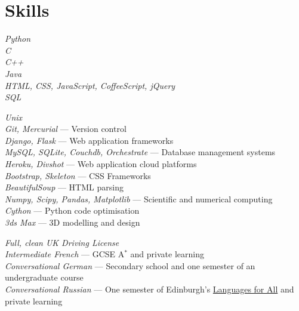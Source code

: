 \documentclass[10pt]{article}
\begin{document}


    \newpage

    \section{Skills}

        {
            \textit{Python}\\
            \textit{C}\\
            \textit{C++}\\
            \textit{Java}\\
            \textit{HTML, CSS, JavaScript, CoffeeScript, jQuery}\\
            \textit{SQL}\\
        }

        {
            \textit{Unix}\\
            \textit{Git, Mercurial} --- Version control\\
            \textit{Django, Flask} --- Web application frameworks\\
            \textit{MySQL, SQLite, Couchdb, Orchestrate} --- Database management systems\\
            \textit{Heroku, Divshot} --- Web application cloud platforms\\
            \textit{Bootstrap, Skeleton} --- CSS Frameworks\\
            \textit{BeautifulSoup} --- HTML parsing\\
            \textit{Numpy, Scipy, Pandas, Matplotlib} --- Scientific and numerical computing\\
            \textit{Cython} --- Python code optimisation\\
            \textit{3ds Max} --- 3D modelling and design
        }


        {
            \textit{Full, clean UK Driving License}\\
            \textit{Intermediate French} --- GCSE A$^*$ and private learning\\
            \textit{Conversational German} --- Secondary school and one semester of an undergraduate course\\
            \textit{Conversational Russian} --- One semester of Edinburgh's \href{http://www.ed.ac.uk/studying/short-courses/languages/for-all}{Languages for All} and private learning
        }
\end{document}
